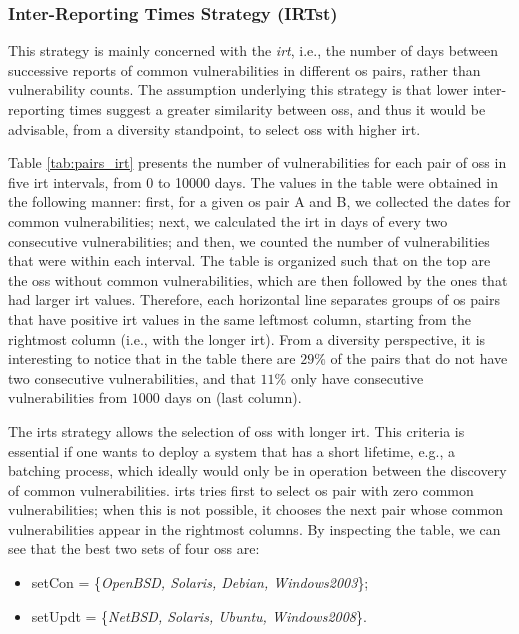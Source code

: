 \subsubsection*{Inter-Reporting Times Strategy (IRTst)} \label{IRT} 
This strategy is mainly concerned with the \emph{\gls{irt}}, i.e., the number of days between successive reports of common vulnerabilities in different \gls{os} pairs, rather than vulnerability counts. 
The assumption underlying this strategy is that lower inter-reporting times suggest a greater similarity between \glspl{os}, and thus it would be advisable, from a diversity standpoint, to select \glspl{os} with higher \gls{irt}.

Table \ref{tab:pairs_irt} presents the number of vulnerabilities for each pair of \glspl{os} in five \gls{irt} intervals, from 0 to 10000 days.
The values in the table were obtained in the following manner: first, for a given \gls{os} pair A and B, we collected the dates for common vulnerabilities; next, we calculated the \gls{irt} in days of every two consecutive vulnerabilities; and then, we counted the number of vulnerabilities that were within each interval.
The table is organized such that on the top are the \glspl{os} without common vulnerabilities, which are then followed by the ones that had larger \gls{irt} values. 
Therefore, each horizontal line separates groups of \gls{os} pairs that have positive \gls{irt} values in the same leftmost column, starting from the rightmost column (i.e., with the longer \gls{irt}). 
From a diversity perspective, it is interesting to notice that in the table there are $29\%$ of the pairs that do not have two consecutive vulnerabilities, and that $11\%$ only have consecutive vulnerabilities from $1000$ days on (last column).

The \gls{irts} strategy allows the selection of \glspl{os} with longer \gls{irt}. 
This criteria is essential if one wants to deploy a system that has a short lifetime, e.g., a batching process, which ideally would only be in operation between the discovery of common vulnerabilities. 
\gls{irts} tries first to select \gls{os} pair with zero common vulnerabilities; when this is not possible, it chooses the next pair whose common vulnerabilities appear in the rightmost columns. 
By inspecting the table, we can see that the best two sets of four \glspl{os} are:

\begin{itemize}
\item setCon = \{\emph{OpenBSD, Solaris, Debian, Windows2003}\};
\item setUpdt = \{\emph{NetBSD, Solaris, Ubuntu, Windows2008}\}.
\end{itemize}


